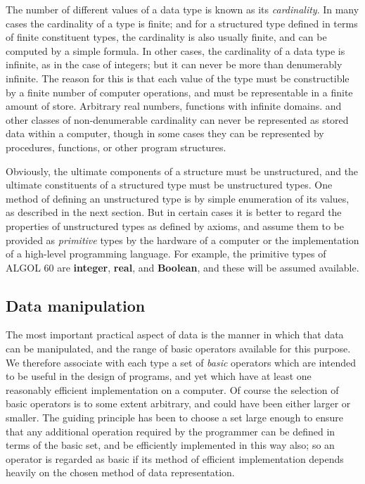 The number of different values of a data type is known as its \textit{cardinality}. In many cases the cardinality of a type is finite; and for a structured type defined in terms of finite constituent types, the cardinality is also usually finite, and can be computed by a simple formula. In other cases, the cardinality of a data type is infinite, as in the case of integers; but it can never be more than denumerably infinite. The reason for this is that each value of the type must be constructible by a finite number of computer operations, and must be representable in a finite amount of store. Arbitrary real numbers, functions with infinite domains. and other classes of non-denumerable cardinality can never be represented as stored data within a computer, though in some cases they can be represented by procedures, functions, or other program structures.

Obviously, the ultimate components of a structure must be unstructured, and the ultimate constituents of a structured type must be unstructured types. One method of defining an unstructured type is by simple enumeration of its values, as described in the next section. But in certain cases it is better to regard the properties of unstructured types as defined by axioms, and assume them to be provided as \textit{primitive} types by the hardware of a computer or the implementation of a high-level programming language. For example, the primitive types of ALGOL 60 are \textbf{integer}, \textbf{real}, and \textbf{Boolean}, and these will be assumed available.

\subsection{Data manipulation}

The most important practical aspect of data is the manner in which that data can be manipulated, and the range of basic operators available for this purpose. We therefore associate with each type a set of \textit{basic} operators which are intended to be useful in the design of programs, and yet which have at least one reasonably efficient implementation on a computer. Of course the selection of basic operators is to some extent arbitrary, and could have been either larger or smaller. The guiding principle has been to choose a set large enough to ensure that any additional operation required by the programmer can be defined in terms of the basic set, and be efficiently implemented in this way also; so an operator is regarded as basic if its method of efficient implementation depends heavily on the chosen method of data representation.

